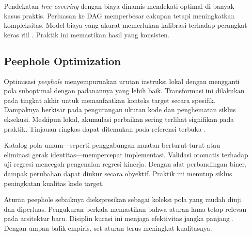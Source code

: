 \documentclass[../main.tex]{subfiles}
\begin{document}
Pendekatan \emph{tree covering} dengan biaya dinamis mendekati optimal di banyak kasus praktis. Perluasan ke DAG memperbesar cakupan tetapi meningkatkan kompleksitas. Model biaya yang akurat memerlukan kalibrasi terhadap perangkat keras riil \citep{WikiInstructionSelection}. Praktik ini memastikan hasil yang konsisten.

\subsection{Peephole Optimization}
Optimisasi \emph{peephole} menyempurnakan urutan instruksi lokal dengan mengganti pola suboptimal dengan padanannya yang lebih baik. Transformasi ini dilakukan pada tingkat akhir untuk memanfaatkan konteks target secara spesifik. Dampaknya berkisar pada pengurangan ukuran kode dan penghematan siklus eksekusi. Meskipun lokal, akumulasi perbaikan sering terlihat signifikan pada praktik. Tinjauan ringkas dapat ditemukan pada referensi terbuka \citep{WikiPeephole}.

Katalog pola umum—seperti penggabungan muatan berturut-turut atau eliminasi gerak identitas—mempercepat implementasi. Validasi otomatis terhadap uji regresi mencegah pengenalan regresi kinerja. Dengan alat perbandingan biner, dampak perubahan dapat diukur secara obyektif. Praktik ini menutup siklus peningkatan kualitas kode target.

Aturan peephole sebaiknya diekspresikan sebagai koleksi pola yang mudah diuji dan diperluas. Pengukuran berkala memastikan bahwa aturan lama tetap relevan pada arsitektur baru. Disiplin kurasi ini menjaga efektivitas jangka panjang \citep{WikiPeephole}. Dengan umpan balik empiris, set aturan terus meningkat kualitasnya.
\end{document}
